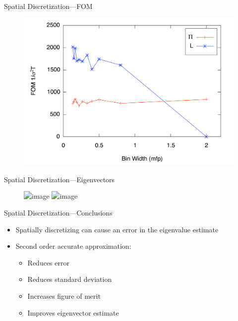 \documentclass[xcolor={usenames, dvipsnames},]{beamer}
\begin{document}
\begin{frame}{Spatial Discretization---FOM}
    \begin{figure}\centering
        \includegraphics[width=.90\textwidth,keepaspectratio]{Figures/ErrorFOM}
    \end{figure}
\end{frame}

\begin{frame}{Spatial Discretization---Eigenvectors}
    \begin{figure}
        \includegraphics<1>[width=0.9\textwidth,keepaspectratio]{Figures/LinearVectors}
        \includegraphics<2>[width=0.9\textwidth,keepaspectratio]{Figures/HistoLinearVectors}
    \end{figure}
\end{frame}

\begin{frame}{Spatial Discretization---Conclusions}
    \begin{itemize}
        \item Spatially discretizing can cause an error in the eigenvalue estimate
        \item Second order accurate approximation:
            \begin{itemize}
                \item Reduces error
                \item Reduces standard deviation
                \item Increases figure of merit
                \item Improves eigenvector estimate
            \end{itemize}
    \end{itemize}
\end{frame}
\end{document}
